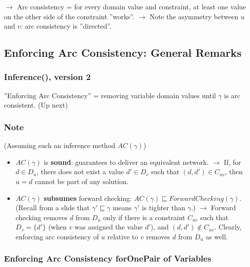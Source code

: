 \documentclass[conference, a4paper]{styles/acmsiggraph}
\begin{document}
            $\rightarrow$ Arc consistency = for every domain value and constraint, at least one value on the other side of the constraint ''works''.\newline
            $\rightarrow$ Note the asymmetry between $u$ and $v$: arc consistency is ''directed''.
        
    \subsection{Enforcing Arc Consistency: General Remarks}
        \subsubsection{Inference(), version 2}
            ''Enforcing Arc Consistency'' = removing variable domain values until $\gamma$ is arc consistent. (Up next)
        
        \subsubsection{Note}
            (Assuming such an inference method $AC(\gamma)$)
            \begin{itemize}
                \item $AC(\gamma)$ is \textbf{sound}: guarantees to deliver an equivalent network.\newline
                $\rightarrow$ If, for $d \in D_u$, there does not exist a value $d' \in D_v$ such that $(d,d') \in C_{uv}$, then $u=d$ cannot be part of any solution.
                \item $AC(\gamma)$ \textbf{subsumes} forward checking: $AC(\gamma) \sqsubseteq ForwardChecking(\gamma)$.\newline
                (Recall from a slide that $\gamma' \sqsubseteq \gamma$ means $\gamma'$ is tighter than $\gamma$.)\newline
                $\rightarrow$ Forward checking removes $d$ from $D_u$ only if there is a constraint $C_{uv}$ such that $D_v = \{d'\}$
                (when $v$ was assigned the value $d'$), and $(d,d') \notin C_{uv}$.
                Clearly, enforcing arc consistency of $u$ relative to $v$ removes $d$ from $D_u$ as well.
            \end{itemize}
    
        \subsubsection{Enforcing Arc Consistency forOnePair of Variables}
\end{document}
